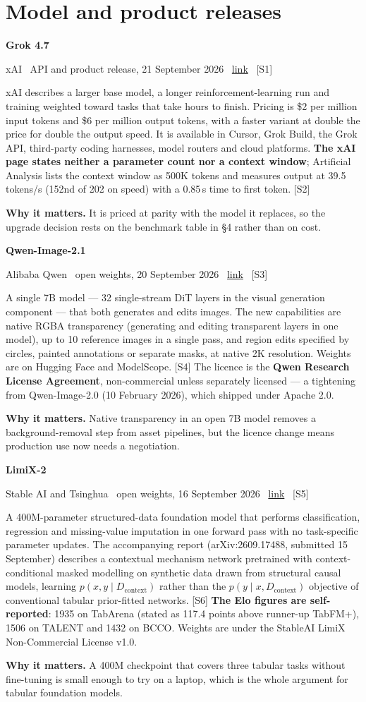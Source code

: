 \documentclass[11pt,a4paper]{article}
\newcommand{\entry}[4]{%
  \par\vspace{0.7em}%
  {\sffamily\bfseries\color{brandink}#1}\par
  {\footnotesize\color{brandgrey}#2 \textbullet\ \href{#3}{link} \textbullet\ \srcref{#4}}\par
  \vspace{0.15em}}
\newcommand{\why}[1]{\par{\small\textbf{Why it matters.} #1}\par}
\newcommand{\srcref}[1]{\textcolor{brandaccent}{[S#1]}}
\begin{document}
\section{Model and product releases}

\entry{Grok 4.7}{xAI \textbullet\ API and product release, 21 September 2026}{https://x.ai/news/grok-4-7}{1}
xAI describes a larger base model, a longer reinforcement-learning run and training
weighted toward tasks that take hours to finish. Pricing is \$2 per million input
tokens and \$6 per million output tokens, with a faster variant at double the price
for double the output speed. It is available in Cursor, Grok Build, the Grok API,
third-party coding harnesses, model routers and cloud platforms. \textbf{The xAI page
states neither a parameter count nor a context window}; Artificial Analysis lists the
context window as 500K tokens and measures output at 39.5 tokens/s (152nd of 202 on
speed) with a 0.85\,s time to first token. \srcref{2}
\why{It is priced at parity with the model it replaces, so the upgrade decision rests
on the benchmark table in \S4 rather than on cost.}

\entry{Qwen-Image-2.1}{Alibaba Qwen \textbullet\ open weights, 20 September 2026}{https://github.com/QwenLM/Qwen-Image-2.1}{3}
A single 7B model --- 32 single-stream DiT layers in the visual generation component
--- that both generates and edits images. The new capabilities are native RGBA
transparency (generating and editing transparent layers in one model), up to 10
reference images in a single pass, and region edits specified by circles, painted
annotations or separate masks, at native 2K resolution. Weights are on Hugging Face
and ModelScope. \srcref{4} The licence is the \textbf{Qwen Research License Agreement},
non-commercial unless separately licensed --- a tightening from Qwen-Image-2.0
(10 February 2026), which shipped under Apache 2.0.
\why{Native transparency in an open 7B model removes a background-removal step from
asset pipelines, but the licence change means production use now needs a negotiation.}

\entry{LimiX-2}{Stable AI and Tsinghua \textbullet\ open weights, 16 September 2026}{https://huggingface.co/stable-ai/LimiX-2}{5}
A 400M-parameter structured-data foundation model that performs classification,
regression and missing-value imputation in one forward pass with no task-specific
parameter updates. The accompanying report (arXiv:2609.17488, submitted 15 September)
describes a contextual mechanism network pretrained with context-conditional masked
modelling on synthetic data drawn from structural causal models, learning
$p(x,y \mid D_{\mathrm{context}})$ rather than the $p(y \mid x, D_{\mathrm{context}})$
objective of conventional tabular prior-fitted networks. \srcref{6} \textbf{The Elo
figures are self-reported}: 1935 on TabArena (stated as 117.4 points above runner-up
TabFM+), 1506 on TALENT and 1432 on BCCO. Weights are under the StableAI LimiX
Non-Commercial License v1.0.
\why{A 400M checkpoint that covers three tabular tasks without fine-tuning is small
enough to try on a laptop, which is the whole argument for tabular foundation models.}
\end{document}
